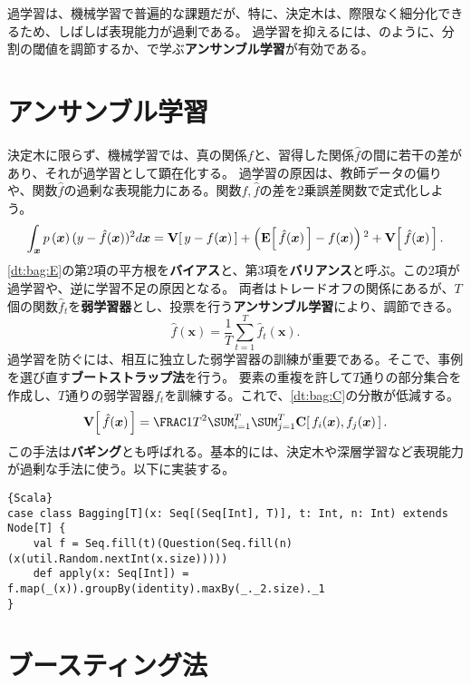 \documentclass[10pt,a4paper]{book}
\begin{document}
過学習は、機械学習で普遍的な課題だが、特に、決定木は、際限なく細分化できるため、しばしば表現能力が過剰である。
過学習を抑えるには、のように、分割の閾値を調節するか、で学ぶ\textbf{アンサンブル学習}が有効である。

\section{アンサンブル学習\label{sect:dt:ensem}}

決定木に限らず、機械学習では、真の関係$f$と、習得した関係$\hat{f}$の間に若干の差があり、それが過学習として顕在化する。
過学習の原因は、教師データの偏りや、関数$\hat{f}$の過剰な表現能力にある。関数$f,\hat{f}$の差を2乗誤差関数で定式化しよう。
%
\begin{equation}
\label{eq:dt:bag:E}
\int_{\bm{x}}\prob{\bm{x}}(y-\hat{f}(\bm{x}))^2d\bm{x} = \Var{y-f(\bm{x})} + \tup{\E{\hat{f}(\bm{x})} - f(\bm{x})}^2 + \Var{\hat{f}(\bm{x})}.
\end{equation}
%
\eqref{dt:bag:E}の第2項の平方根を\textbf{バイアス}と、第3項を\textbf{バリアンス}と呼ぶ。この2項が過学習や、逆に学習不足の原因となる。
両者はトレードオフの関係にあるが、$T$個の関数$\hat{f}_t$を\textbf{弱学習器}とし、投票を行う\textbf{アンサンブル学習}により、調節できる。
%
\begin{equation}
\label{eq:dt:bag:f}
\hat{f}(\bm{x}) = \frac{1}{T} \sum_{t=1}^T \hat{f}_t(\bm{x}).
\end{equation}
%
過学習を防ぐには、相互に独立した弱学習器の訓練が重要である。そこで、事例を選び直す\textbf{ブートストラップ法}を行う。
要素の重複を許して$T$通りの部分集合を作成し、$T$通りの弱学習器$f_t$を訓練する。これで、\eqref{dt:bag:C}の分散が低減する。
%
\begin{equation}
\label{eq:dt:bag:C}
\Var{\hat{f}(\bm{x})} = \frac{1}{T^2}\sum_{i=1}^T \sum_{j=1}^T \Cov{f_i(\bm{x}),f_j(\bm{x})}.
\end{equation}
%
この手法は\textbf{バギング}とも呼ばれる。基本的には、決定木や深層学習など表現能力が過剰な手法に使う。以下に実装する。

\begin{Verbatim}{Scala}
case class Bagging[T](x: Seq[(Seq[Int], T)], t: Int, n: Int) extends Node[T] {
	val f = Seq.fill(t)(Question(Seq.fill(n)(x(util.Random.nextInt(x.size)))))
	def apply(x: Seq[Int]) = f.map(_(x)).groupBy(identity).maxBy(_._2.size)._1
}
\end{Verbatim}

\section{ブースティング法}
\end{document}
